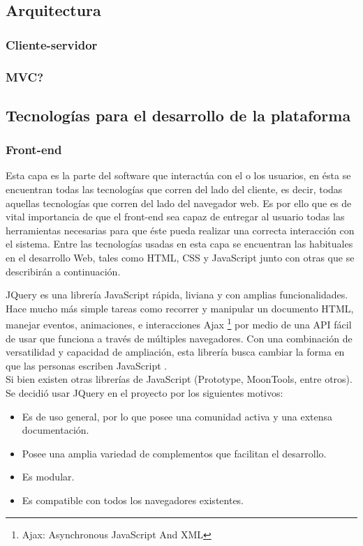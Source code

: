 \subsection{Arquitectura}

\subsubsection{Cliente-servidor}

\subsubsection{MVC?}

\subsection{Tecnologías para el desarrollo de la plataforma}

\subsubsection{Front-end}

Esta capa es la parte del software que interactúa con el o los usuarios, en ésta  se encuentran todas las tecnologías que corren del lado del cliente, es decir, todas aquellas tecnologías que corren del lado del navegador web. Es por ello que es de vital importancia de que el front-end sea capaz de entregar  al usuario todas las herramientas necesarias para que éste pueda realizar una correcta interacción con el sistema. Entre las tecnologías usadas en esta capa se encuentran las habituales en el desarrollo Web, tales como HTML, CSS y JavaScript junto con otras que se describirán a continuación.


JQuery es una librería JavaScript rápida, liviana y con amplias funcionalidades. Hace mucho más simple tareas como recorrer y manipular un documento HTML, manejar eventos, animaciones, e interacciones Ajax	\footnote{Ajax: Asynchronous JavaScript And XML} por medio de una API fácil de usar que funciona a través de múltiples navegadores. Con una combinación de versatilidad y capacidad de ampliación, esta librería busca cambiar la forma en que las personas escriben JavaScript \cite{JQu15}.
\\

Si bien existen otras librerías de JavaScript (Prototype, MoonTools, entre otros). Se decidió usar JQuery en el proyecto por los siguientes motivos:
\begin{itemize}
	\item Es de uso general, por lo que posee una comunidad activa y una extensa documentación.
	\item Posee una amplia variedad de complementos que facilitan el desarrollo.
	\item Es modular.
	\item Es compatible con todos los navegadores existentes.
\end{itemize}


